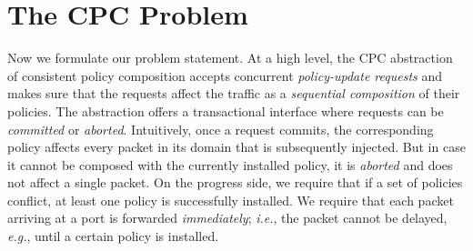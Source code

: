 \documentclass[11pt,pdftex,letter]{article}
\newcommand{\eg}{{\it e.g.}}
\newcommand{\ie}{{\it i.e.}}
\newcommand{\mcnote}[1]{\textcolor{heraldBlue}{\small \bf [MC: #1]}}
\newcommand{\ssnote}[1]{\textcolor{heraldBlue}{\small \bf [SS: #1]}}
\newcommand{\pknote}[1]{\textcolor{heraldBlue}{\small \bf [PK: #1]}}
\newcommand{\mcnote}[1]{}
\newcommand{\ssnote}[1]{}
\newcommand{\pknote}[1]{}
\begin{document}
\section{The CPC Problem}\label{sec:problem}

Now we formulate our problem statement.
At a high level, the CPC abstraction of consistent policy composition
accepts concurrent \emph{policy-update requests} and makes sure that
the requests affect the traffic as a \emph{sequential composition} of
their policies.
The abstraction offers a transactional interface
where requests can be \emph{committed} or \emph{aborted}.
Intuitively, once a request commits, the corresponding policy
affects every packet in its
domain that is subsequently injected.
But in case it cannot be composed with the currently
installed policy, it is \emph{aborted} and does not affect a
single packet. On the progress side, we require that if a set of policies conflict, at least one
policy is successfully installed.
We require that each packet arriving at a port is forwarded \emph{immediately}; \ie, the packet cannot
be delayed, \eg, until a certain policy is installed.
\end{document}
